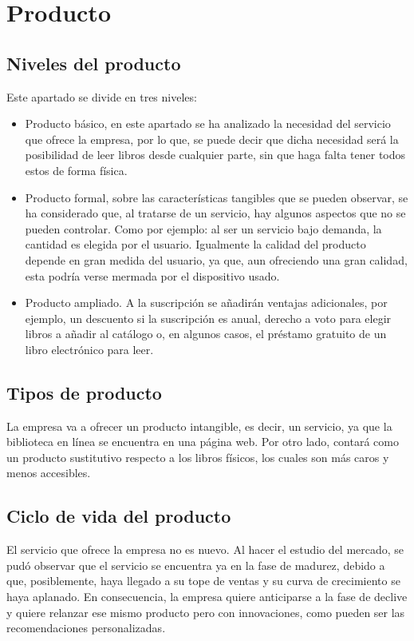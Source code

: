 \documentclass[openany,overnay,a4paper, twoside, 12pt]{book}
\begin{document}
\section{Producto}
\subsection{Niveles del producto}
Este apartado se divide en tres niveles:
\begin{itemize}
\item Producto básico, en este apartado se ha analizado la necesidad del servicio que ofrece la empresa, por lo que, se puede decir que dicha necesidad será la posibilidad de leer libros desde cualquier parte, sin que haga falta tener todos estos de forma física.
\item Producto formal, sobre las características tangibles que se pueden observar, se ha considerado que, al tratarse de un servicio, hay algunos aspectos que no se pueden controlar. Como por ejemplo: al ser un servicio bajo demanda, la cantidad es elegida por el usuario. Igualmente la calidad del producto depende en gran medida del usuario, ya que, aun ofreciendo una gran calidad, esta podría verse mermada por el dispositivo usado.
\item Producto ampliado. A la suscripción se añadirán ventajas adicionales, por ejemplo, un descuento si la suscripción es anual, derecho a voto para elegir libros a añadir al catálogo o, en algunos casos, el préstamo gratuito de un libro electrónico para leer.
\end{itemize}
\subsection{Tipos de producto}
La empresa va a ofrecer un producto intangible, es decir, un servicio, ya que la biblioteca en línea se encuentra en una página web. Por otro lado, contará como un producto sustitutivo respecto a los libros físicos, los cuales son más caros y menos accesibles.
\subsection{Ciclo de vida del producto}
El servicio que ofrece la empresa no es nuevo. Al hacer el estudio del mercado, se pudó observar que el servicio se encuentra ya en la fase de madurez, debido a que, posiblemente, haya llegado a su tope de ventas y su curva de crecimiento se haya aplanado. En consecuencia, la empresa quiere anticiparse a la fase de declive y quiere relanzar ese mismo producto pero con innovaciones, como pueden ser las recomendaciones personalizadas.
\end{document}
